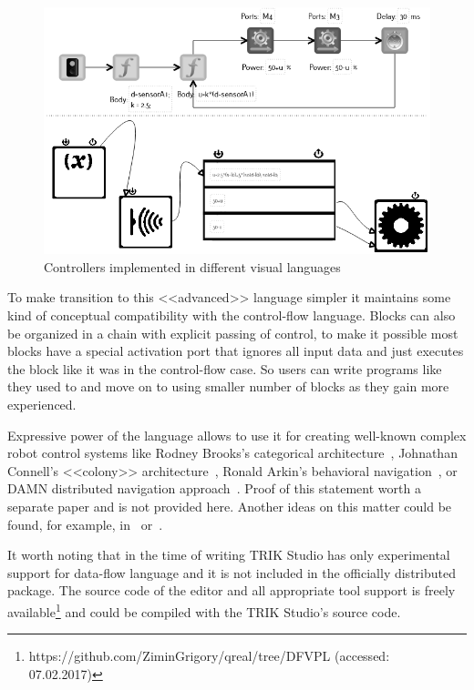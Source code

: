 \documentclass[conference]{IEEEtran}
\begin{document}
\begin{figure}[ht]
    \centering
    \includegraphics[width=\columnwidth]{TS_AlongTheBox_Comparison.png}
    \caption{Controllers implemented in different visual languages}
    \label{image:alongTheBox_CF_DF}
\end{figure}

To make transition to this <<advanced>> language simpler it maintains some kind of conceptual compatibility with the control-flow language. Blocks can also be organized in a chain with explicit passing of control, to make it possible most blocks have a special activation port that ignores all input data and just executes the block like it was in the control-flow case. So users can write programs like they used to and move on to using smaller number of blocks as they gain more experienced.

Expressive power of the language allows to use it for creating well-known complex robot control systems like Rodney Brooks's categorical architecture~\cite{brooks1986robust}, Johnathan Connell's <<colony>> architecture~\cite{connell1989colony}, Ronald Arkin's behavioral navigation~\cite{arkin1987motor}, or DAMN distributed navigation approach~\cite{rosenblatt1997damn}. Proof of this statement worth a separate paper and is not provided here. Another ideas on this matter could be found, for example, in~\cite{simpson2009toward} or~\cite{banyasad2000visual}.

It worth noting that in the time of writing TRIK Studio has only experimental support for data-flow language and it is not included in the officially distributed package. The source code of the editor and all appropriate tool support is freely available\footnote{https://github.com/ZiminGrigory/qreal/tree/DFVPL (accessed: 07.02.2017)} and could be compiled with the TRIK Studio's source code.
\end{document}
